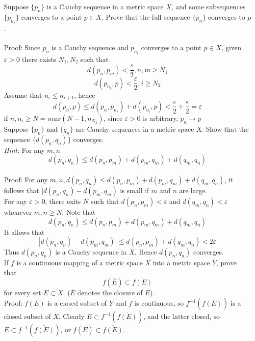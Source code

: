 \documentclass [12pt,letterpaper]{exam}
\def\be{\begin{equation}}
\def\ee{\end{equation}}
\begin{document}
\begin{questions}
\question Suppose $\{p_n \}$ is a Cauchy sequence in a metric space
$X$, and some subsequences $\{p_{n_i}\}$ converges to a point $p \in
X$. Prove that the full sequence $\{p_n \}$ converges to $p$.\\\\
Proof: Since ${p_n}$ is a Cauchy sequence and ${p_{n_i}}$ converges to a point $p \in X$, given $\varepsilon > 0$ there exists $N_1,N_2$ such that
$$d(p_n,p_m) < \frac{\varepsilon}{2}, n,m \geq N_1$$
$$d(p_{n_i},p) < \frac{\varepsilon}{2}, i \geq N_2$$
Assume that $n_i \leq n_{i+1}$, hence
$$d(p_n,p) \leq d(p_n,p_{n_i}) + d(p_{n_i},p) < \frac{\varepsilon}{2} + \frac{\varepsilon}{2} = \varepsilon$$
if $n,n_i \geq N = max(N-1,n_{N_2})$, since $\varepsilon > 0$ is arbitrary, $p_n \rightarrow p$\\


\question Suppose $\{p_n \}$ and $\{q_n \}$ are Cauchy sequences in
a metric space $X$. Show that the sequence $\{d(p_n,q_n)\}$
converges.\\[3mm]
{\em Hint:} For any $m,n$ \be d(p_n,q_n) \leq
d(p_n,p_m)+d(p_m,q_m)+d(q_m,q_n) \nonumber \ee\\
Proof: For any $m,n, d(p_n,q_n) \leq d(p_n,p_m)+d(p_m,q_m)+d(q_m,q_n)$, it follows that $|d(p_n,q_n) - d(p_m,q_m)$ is small if $m$ and $n$ are large.\\
For any $\varepsilon > 0$, there exits $N$ such that $d(p_n,p_m) < \varepsilon$ and $d(q_m,q_n) < \varepsilon$ whenever $m,n \geq N$. Note that $$d(p_n,q_n) \leq d(p_n,p_m) + d(p_m,q_m) + d(q_m,q_n)$$
It allows that $$|d(p_n,q_n) - d(p_m,q_m)| \leq d(p_n,p_m) + d(q_m,q_n) < 2\varepsilon$$
Thus ${d(p_n,q_n)}$ is a Cauchy sequence in $X$. Hence ${d(p_n,q_n)}$ converges.\\

\question If $f$ is a continuous mapping of a metric space $X$ into
a metric space $Y$, prove that \be f(\overline{E}) \subset
\overline{f(E)} \nonumber \ee for every set $E \subset X$.
($\overline{E}$ denotes the closure of $E$).\\
Proof: $\overline{f(E)}$ is a closed subset of $Y$ and $f$ is continuous, so $f^{-1}(\overline{f(E)})$ is a closed subset of $X$. Clearly $E \subset f^{-1}(\overline{f(E)})$, and the latter closed, so $\overline{E} \subset f^{-1}(\overline{f(E)})$, or $f(\overline{E}) \subset \overline{f(E)}$.\\




\end{questions}
\end{document}
